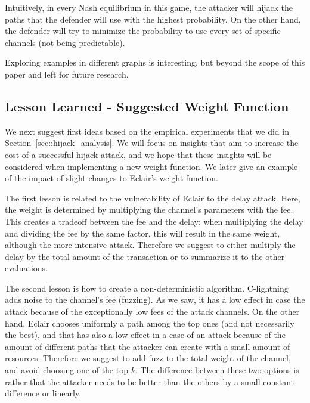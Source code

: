Intuitively, in every Nash equilibrium in this game, 
the attacker will hijack the paths that the defender will use with the highest probability. On the other hand, the defender will try to minimize the probability to use every set of specific channels (not being predictable).

Exploring examples in different graphs is interesting,
but beyond the scope of this paper and left for future research. 

    
    
    
    
    
    

    
    

  

\subsection{Lesson Learned - Suggested Weight Function}
We next suggest first ideas 
based on the empirical experiments that we did in Section~\ref{sec::hijack_analysis}. 
We will focus on insights that aim to increase the cost of a successful hijack attack, 
and we hope that these insights will be considered when implementing a new weight function. 
We later give an example of the impact of slight changes to Eclair's weight function.

The first lesson is related to the vulnerability of Eclair to the delay attack. 
Here, the weight is determined by multiplying the channel's parameters with the fee. 
This creates a tradeoff between the fee and the delay: when multiplying
the delay and dividing the fee by the same factor, this will result in the same weight, 
although the more intensive attack. Therefore we suggest to either multiply the delay by the total amount of the transaction or to summarize it to the other evaluations.

The second lesson is how to create a non-deterministic algorithm. 
C-lightning adds noise to the channel's fee (fuzzing). As we saw, it has a
low effect in case the attack because of the exceptionally low fees of the attack channels. On the other hand, Eclair chooses uniformly a path among the top ones (and not necessarily the best), and that has also a low effect in a case of an attack because of the amount of different paths that the attacker 
can create with a small amount of resources. Therefore we suggest to add fuzz to the total weight of the channel, and avoid choosing one of the top-$k$. The difference between these two options is rather 
that the attacker needs to be better than the others by a small constant difference or linearly.

